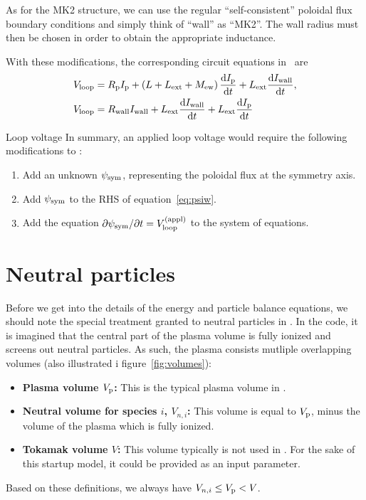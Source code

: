 \documentclass{notes}
\newcommand{\Ip}{I_{\rm p}}
\newcommand{\Iw}{I_{\rm wall}}
\newcommand{\Vl}{V_{\rm loop}}
\newcommand{\Vp}{V_{\rm p}}
\begin{document}
    As for the MK2 structure, we can use the regular ``self-consistent''
    poloidal flux boundary conditions and simply think of ``wall'' as ``MK2''.
    The wall radius must then be chosen in order to obtain the appropriate
    inductance.

    With these modifications, the corresponding circuit equations in \DREAM\
    are
    \begin{equation}
        \begin{aligned}
            V_{\rm loop} &= R_{\rm p}\Ip + \left( L + L_{\rm ext} + M_{\rm ew} \right)\frac{\dd\Ip}{\dd t} + L_{\rm ext}\frac{\dd\Iw}{\dd t},\\
            V_{\rm loop} &= R_{\rm wall}\Iw + L_{\rm ext}\frac{\dd\Iw}{\dd t} + L_{\rm ext}\frac{\dd\Ip}{\dd t}
        \end{aligned}
    \end{equation}

    \begin{summarybox}{Loop voltage}
        In summary, an applied loop voltage would require the following
        modifications to \DREAM:
        \begin{enumerate}
            \item Add an unknown $\psi_{\rm sym}$, representing the poloidal flux
            at the symmetry axis.
            \item Add $\psi_{\rm sym}$ to the RHS of equation~\eqref{eq:psiw}.
            \item Add the equation
            $\partial\psi_{\rm sym}/\partial t = \Vl^{(\rm appl)}$ to the system
            of equations.
        \end{enumerate}
    \end{summarybox}

    \section{Neutral particles}
    Before we get into the details of the energy and particle balance equations,
    we should note the special treatment granted to neutral particles in \DYON.
    In the code, it is imagined that the central part of the plasma volume is
    fully ionized and screens out neutral particles. As such, the plasma
    consists mutliple overlapping volumes (also illustrated i
    figure~\ref{fig:volumes}):
    \begin{itemize}
        \item {\bf Plasma volume $\Vp$:} This is the typical plasma volume in
        \DREAM.
        \item {\bf Neutral volume for species $i$, $V_{n,i}$:} This volume is
        equal to $\Vp$, minus the volume of the plasma which is fully ionized.
        \item {\bf Tokamak volume $V$:} This volume typically is not used in
        \DREAM. For the sake of this startup model, it could be provided as an
        input parameter.
    \end{itemize}
    Based on these definitions, we always have $V_{n,i}\leq \Vp < V$.
\end{document}
